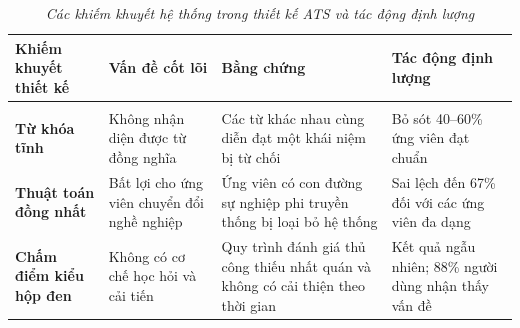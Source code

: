 \documentclass{article}
\begin{document}
\begin{longtable}{|
  >{\raggedright\arraybackslash}p{}|
  >{\raggedright\arraybackslash}p{}|
  >{\raggedright\arraybackslash}p{}|
  >{\raggedright\arraybackslash}p{}|}
  \hline
  \textbf{Khiếm khuyết thiết kế} &
  \textbf{Vấn đề cốt lõi} &
  \textbf{Bằng chứng} &
  \textbf{Tác động định lượng} \\
  \hline
  \endfirsthead

  \endhead

  \hline
  \endfoot

  \hline
  \caption{\centering\textit{Các khiếm khuyết hệ thống trong thiết kế ATS và tác động định lượng}}
  \label{tab:ats-design-flaws} \\
  \endlastfoot

  \textbf{Từ khóa tĩnh} &
  Không nhận diện được từ đồng nghĩa &
  Các từ khác nhau cùng diễn đạt một khái niệm bị từ chối &
  Bỏ sót 40--60\% ứng viên đạt chuẩn \\
  \hline

  \textbf{Thuật toán đồng nhất} &
  Bất lợi cho ứng viên chuyển đổi nghề nghiệp &
  Ứng viên có con đường sự nghiệp phi truyền thống bị loại bỏ hệ thống &
  Sai lệch đến 67\% đối với các ứng viên đa dạng \\
  \hline

  \textbf{Chấm điểm kiểu hộp đen} &
  Không có cơ chế học hỏi và cải tiến &
  Quy trình đánh giá thủ công thiếu nhất quán và không có cải thiện theo thời gian &
  Kết quả ngẫu nhiên; 88\% người dùng nhận thấy vấn đề \\

\end{longtable}
\end{document}
